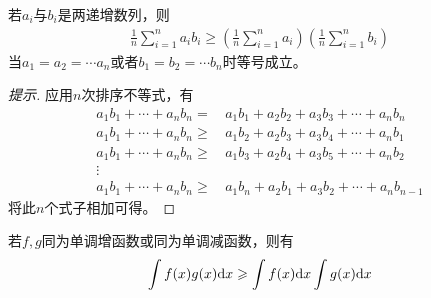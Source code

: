 \begin{example}
  若$a_i$与$b_i$是两递增数列，则
  \begin{align*}
    \frac1n\sum_{i=1}^n a_ib_i\ge
    \left( \frac1n\sum_{i=1}^n a_i \right)
    \left( \frac1n\sum_{i=1}^n b_i \right)
  \end{align*}
  当$a_1=a_2=\cdots a_n$或者$b_1=b_2=\cdots b_n$时等号成立。
\end{example}
\begin{proof}[提示]
  应用$n$次排序不等式，有
  \begin{align*}
    a_1b_1 + \cdots + a_nb_n = &\,   a_1b_1 + a_2b_2 + a_3b_3 + \cdots + a_nb_n\\
    a_1b_1 + \cdots + a_nb_n \ge&\,  a_1b_2 + a_2b_3 + a_3b_4 + \cdots + a_nb_1\\
    a_1b_1 + \cdots + a_nb_n \ge&\,  a_1b_3 + a_2b_4 + a_3b_5 + \cdots + a_nb_2\\
    \vdots\\
    a_1b_1 + \cdots + a_nb_n \ge&\,  a_1b_n + a_2b_1 + a_3b_2 + \cdots + a_nb_{n-1}
  \end{align*}
  将此$n$个式子相加可得。
\end{proof}

\begin{example}[切比雪夫不等式的积分形式]
  若$f,g$同为单调增函数或同为单调减函数，则有
  \begin{align*}
    \int f(x)g(x)\mathrm{d}x\geqslant\int f(x)\mathrm{d}x\int g(x)\mathrm{d}x
  \end{align*}
\end{example}